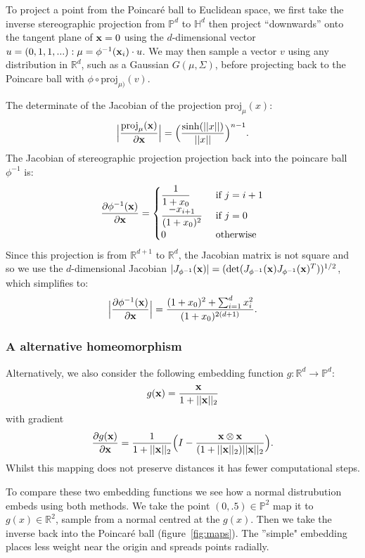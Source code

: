 \documentclass[11pt, twocolumn]{article}
\newcommand{\be}{\begin{equation*}}
\newcommand{\ee}{\end{equation*}}
\newcommand{\bee}{\begin{eqnarray*}}
\newcommand{\eee}{\end{eqnarray*}}
\begin{document}
To project a point from the Poincaré ball to Euclidean space, we first take the inverse stereographic projection from $\mathbb{P}^d$ to $\mathbb{H}^d$ then project ``downwards'' onto the tangent plane of $\bold{x}=0$ using the $d$-dimensional vector $u=(0, 1, 1,...): \mu = \phi^{-1}(\bold{x}_{i}) \cdot u $.
We may then sample a vector $v$ using any distribution in $\mathbb{R}^d$, such as a Gaussian $G(\mu, \Sigma)$, before projecting back to the Poincare ball with $\phi \circ \text{proj}_{\mu)}(v)$.

The determinate of the Jacobian of the projection $\text{proj}_{\mu}(x)$:
\be
\Big| \frac{\text{proj}_{\mu} (\bold{x})} {\partial \bold{x}} \Big| = \Big(\dfrac{\sinh(||x||)}{||x||}\Big)^{n-1}.
\ee
The Jacobian of stereographic projection projection back into the poincare ball $\phi^{-1}$ is:
\bee
\frac{\partial \phi^{-1}(\bold{x})} {\partial \bold{x}} = \begin{cases}
\dfrac{1}{1+x_{0}} &\text{ if } j = i+1\\
\dfrac{-x_{i+1}}{(1+x_{0})^{2}} &\text{ if } j = 0\\
0 &\text{ otherwise}\\
\end{cases}
\eee
Since this projection is from $\mathbb{R}^{d+1}$ to $\mathbb{R}^{d}$, the Jacobian matrix is not square and so we  use the $d$-dimensional Jacobian $|J_{\phi^{-1}}(\bold{x})| = (\text{det} (J_{\phi^{-1}} (\bold{x}) J_{\phi^{-1}} (\bold{x})^{T}))^{1/2}$, which simplifies to:
\be
\Big|\frac{\partial {\phi^{-1}}(\bold{x})}{\partial \bold{x}}\Big| = \dfrac{(1+x_{0})^{2} + \sum_{i=1}^{d} x_{i}^{2}}{(1+x_{0})^{2(d+1)}}.
\ee

\subsubsection{A alternative homeomorphism}
Alternatively, we also consider the following embedding function $g: \mathbb{R}^{d} \to \mathbb{P}^{d}$:
\be
g(\bold{x}) = \dfrac{\bold{x}}{1+||\bold{x}||_{2}}
\ee
with gradient
\be
\frac{\partial g(\bold{x})}{\partial \bold{x}} = 
\dfrac{1}{1+||\bold{x}||_{2}} \Big( I - \dfrac{\bold{x} \otimes \bold{x}}{(1+||\bold{x}||_{2})||\bold{x}||_{2}} \Big).
\ee
Whilst this mapping does not preserve distances it has fewer computational steps.

To compare these two embedding functions we see how a normal distrubution embeds using both methods.
We take the point $(0, .5) \in \mathbb{P}^2$ map it to $g(x) \in \mathbb{R}^2$, sample from a normal centred at the $g(x)$.
Then we take the inverse back into the Poincaré ball (figure~\ref{fig:maps}).
The ''simple" embedding places less weight near the origin and spreads points radially.
\end{document}
